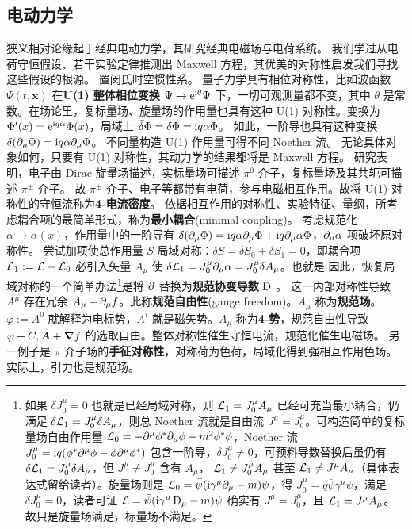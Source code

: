 \subsection{电动力学}\label{sec:ED}

狭义相对论缘起于经典电动力学，其研究经典电磁场与电荷系统。
我们学过从电荷守恒假设、若干实验定律推测出 Maxwell 方程，其优美的对称性启发我们寻找这些假设的根源。
置闵氏时空惯性系。
量子力学具有相位对称性，比如波函数 $\Psi(t,\bm x)$ 在\textbf{U(1) 整体相位变换} $\Psi\to \mathrm{e}^{\mathrm{i}\theta}\Psi$ 下，一切可观测量都不变，其中 $\theta$ 是常数。在场论里，复标量场、旋量场的作用量也具有这种 U(1) 对称性。变换为 $\Phi'(x) = \mathrm{e}^{\mathrm{i} q \alpha} \Phi(x)$，局域上 $\bar\delta\Phi = \delta\Phi = \mathrm{i} q \alpha \Phi$。
如此，一阶导也具有这种变换 $\delta(\partial_\mu\Phi)=\mathrm{i} q \alpha \partial_\mu\Phi$。
不同量构造 U(1) 作用量可得不同 Noether 流。
无论具体对象如何，只要有 U(1) 对称性，其动力学的结果都将是 Maxwell 方程。
研究表明，电子由 Dirac 旋量场描述，实标量场可描述 $\pi^0$ 介子，复标量场及其共轭可描述 $\pi^\pm$ 介子。
故 $\pi^\pm$ 介子、电子等都带有电荷，参与电磁相互作用。故将 U(1) 对称性的守恒流称为\textbf{4-电流密度}。
依据相互作用的对称性、实验特征、量纲，所考虑耦合项的最简单形式，称为\textbf{最小耦合}(minimal coupling)。
考虑规范化 $\alpha\to \alpha(x)$，作用量中的一阶导有 $\delta(\partial_\mu\Phi)=\mathrm{i} q \alpha \partial_\mu\Phi + \mathrm{i} q \partial_\mu\alpha \Phi$，$\partial_\mu\alpha$ 项破坏原对称性。
尝试加项使总作用量 $S$ 局域对称：$\delta S = \delta S_0 + \delta S_1 = 0$，即耦合项 $\mathcal{L}_1:=\mathcal{L}-\mathcal{L}_0$ 必引入矢量 $A_\mu$ 使 $\delta\mathcal{L}_1 = J^\mu_0 \partial_\mu\alpha = J^\mu_0\delta A_\mu$。也就是
因此，恢复局域对称的一个简单办法\footnote{如果 $\delta J_0^\mu = 0$ 也就是已经局域对称，则 $\mathcal{L}_1 = J_0^\mu A_\mu$ 已经可充当最小耦合，仍满足 $\delta\mathcal{L}_1 =J_0^\mu\delta A_\mu$，则总 Noether 流就是自由流 $J^\mu = J^\mu_0$。可构造简单的复标量场自由作用量 $\mathcal{L}_0=-\partial^\mu\phi^*\partial_\mu\phi-m^2\phi^*\phi$，Noether 流 $J_0^\mu = \mathrm{i} q(\phi^* \partial^\mu \phi - \phi\partial^\mu \phi^*)$ 包含一阶导，$\delta J_0^\mu \ne 0$，可预料导数替换后虽仍有 $\delta\mathcal{L}_1 = J^\mu_0\delta A_\mu$，但 $J^\mu\ne J^\mu_0$ 含有 $A_\mu$， $\mathcal{L}_1\ne J_0^\mu A_\mu$ 甚至 $\mathcal{L}_1\ne J^\mu A_\mu$（具体表达式留给读者）。旋量场则是 $\mathcal{L}_0=\bar\psi(\mathrm{i}\gamma^\mu\partial_\mu - m)\psi$，得 $J_0^\mu = q\bar\psi\gamma^\mu\psi$，满足$\delta J_0^\mu = 0$，读者可证 $\Lag=\bar\psi(\i\gamma^\mu \D_\mu - m)\psi$ 确实有 $J^\mu=J_0^\mu$，且 $\mathcal{L}_1=J^\mu A_\mu$。故只是旋量场满足，标量场不满足。}是将 $\partial$ 替换为\textbf{规范协变导数} $\D$。
这一内部对称性导致 $A^\mu$ 存在冗余 $A_\mu+\partial_\mu f$。此称\textbf{规范自由性}(gauge freedom)。$A_\mu$ 称为\textbf{规范场}。
$\varphi:=A^0$ 就解释为电标势，$A^i$ 就是磁矢势。$A_\mu$ 称为\textbf{4-势}，规范自由性导致 $\varphi+C,\bm A+\grad f$ 的选取自由。整体对称性催生守恒电流，规范化催生电磁场。
另一例子是 $\pi$ 介子场的\textbf{手征对称性}，对称荷为色荷，局域化得到强相互作用色场。实际上，引力也是规范场。


